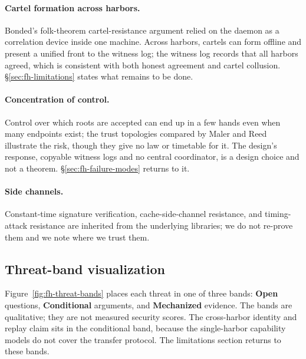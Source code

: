 \documentclass[11pt,a4paper]{article}
\theoremstyle{definition}
\theoremstyle{remark}
\begin{document}
\paragraph{Cartel formation across harbors.} Bonded's folk-theorem cartel-resistance argument relied on the daemon as a correlation device inside one machine. Across harbors, cartels can form offline and present a unified front to the witness log; the witness log records that all harbors agreed, which is consistent with both honest agreement and cartel collusion. \S\ref{sec:fh-limitations} states what remains to be done.

\paragraph{Concentration of control.} Control over which roots are accepted can end up in a few hands even when many endpoints exist; the
trust topologies compared by Maler and Reed~ illustrate
the risk, though they give no law or timetable for it. The design's response, copyable witness logs and no central coordinator, is a design choice and not a theorem. \S\ref{sec:fh-failure-modes} returns to it.

\paragraph{Side channels.} Constant-time signature verification, cache-side-channel resistance, and timing-attack resistance are inherited from the underlying libraries; we do not re-prove them and we note where we trust them.

\subsection{Threat-band visualization}\label{sec:fh-threat-band-viz}

Figure~\ref{fig:fh-threat-bands} places each threat in one of three bands: \textbf{Open} questions, \textbf{Conditional} arguments, and \textbf{Mechanized} evidence. The bands are qualitative; they are not measured security scores. The cross-harbor identity and replay claim sits in the conditional band, because the single-harbor capability models do not cover the transfer protocol. The limitations section returns to these bands.



\ifdefined\pdreflectionplate{}\fi
\end{document}
